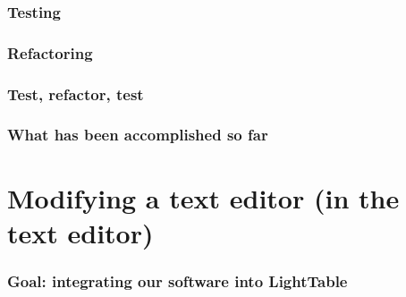 \documentclass{beamer}
\begin{document}
\begin{frame}[fragile]
\frametitle{Testing}
		
\end{frame}

\begin{frame}[fragile]
\frametitle{Refactoring}
		
\end{frame}

\begin{frame}[fragile]
\frametitle{Test, refactor, test}
		
\end{frame}

\begin{frame}[fragile]
\frametitle{What has been accomplished so far}
		
\end{frame}

\section{Modifying a text editor (in the text editor)}

\begin{frame}[fragile]
\frametitle{Goal: integrating our software into LightTable}
		
\end{frame}
\end{document}
